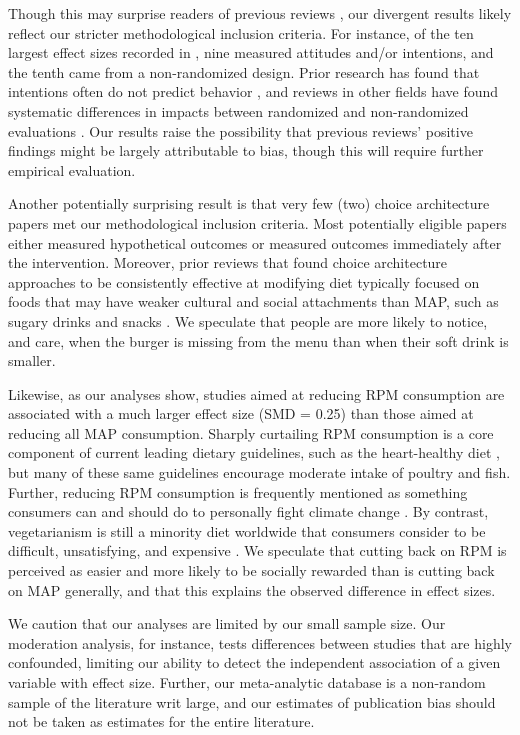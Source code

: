 \documentclass[sn-nature,referee,pdflatex]{sn-jnl}
\begin{document}
Though this may surprise readers of previous reviews
\citep{mathur2021meta, meier2022, mertens2022}, our divergent results
likely reflect our stricter methodological inclusion criteria. For
instance, of the ten largest effect sizes recorded in
\citep{mathur2021effectiveness}, nine measured attitudes and/or
intentions, and the tenth came from a non-randomized design. Prior
research has found that intentions often do not predict behavior
\citep{mathur2021effectiveness}, and reviews in other fields have found
systematic differences in impacts between randomized and non-randomized
evaluations \citep{porat2024, stevenson2023}. Our results raise the
possibility that previous reviews' positive findings might be largely
attributable to bias, though this will require further empirical
evaluation.

Another potentially surprising result is that very few (two) choice
architecture papers met our methodological inclusion criteria. Most
potentially eligible papers either measured hypothetical outcomes or
measured outcomes immediately after the intervention. Moreover, prior
reviews that found choice architecture approaches to be consistently
effective at modifying diet typically focused on foods that may have
weaker cultural and social attachments than MAP, such as sugary drinks
and snacks \citep{venema2020, adriaanse2009}. We speculate that people
are more likely to notice, and care, when the burger is missing from the
menu than when their soft drink is smaller.

Likewise, as our analyses show, studies aimed at reducing RPM
consumption are associated with a much larger effect size (SMD = 0.25)
than those aimed at reducing all MAP consumption. Sharply curtailing RPM
consumption is a core component of current leading dietary guidelines,
such as the heart-healthy diet \citep{diab2023}, but many of these same
guidelines encourage moderate intake of poultry and fish. Further,
reducing RPM consumption is frequently mentioned as something consumers
can and should do to personally fight climate change
\citep{auclair2024}. By contrast, vegetarianism is still a minority diet
worldwide \citep{tilman2014} that consumers consider to be difficult,
unsatisfying, and expensive \citep{bryant2019}. We speculate that
cutting back on RPM is perceived as easier and more likely to be
socially rewarded than is cutting back on MAP generally, and that this
explains the observed difference in effect sizes.

We caution that our analyses are limited by our small sample size. Our
moderation analysis, for instance, tests differences between studies
that are highly confounded, limiting our ability to detect the
independent association of a given variable with effect size. Further,
our meta-analytic database is a non-random sample of the literature writ
large, and our estimates of publication bias should not be taken as
estimates for the entire literature.
\end{document}
